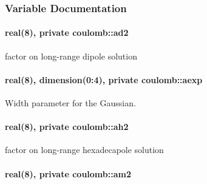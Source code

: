 \subsubsection{Variable Documentation}
\paragraph[{\texorpdfstring{ad2}{ad2}}]{\setlength{\rightskip}{0pt plus 5cm}real(8), private coulomb\+::ad2\hspace{0.3cm}{\ttfamily [private]}}\hypertarget{namespacecoulomb_afda3f373d6098c0a75ede859f3529343}{}\label{namespacecoulomb_afda3f373d6098c0a75ede859f3529343}


factor on long-\/range dipole solution 

\paragraph[{\texorpdfstring{aexp}{aexp}}]{\setlength{\rightskip}{0pt plus 5cm}real(8), dimension(0\+:4), private coulomb\+::aexp\hspace{0.3cm}{\ttfamily [private]}}\hypertarget{namespacecoulomb_a22c47ac5a6dd966aa0d24fa79c553716}{}\label{namespacecoulomb_a22c47ac5a6dd966aa0d24fa79c553716}


Width parameter for the Gaussian. 

\paragraph[{\texorpdfstring{ah2}{ah2}}]{\setlength{\rightskip}{0pt plus 5cm}real(8), private coulomb\+::ah2\hspace{0.3cm}{\ttfamily [private]}}\hypertarget{namespacecoulomb_a87a3eab5442a0668be2dfe42f7024081}{}\label{namespacecoulomb_a87a3eab5442a0668be2dfe42f7024081}


factor on long-\/range hexadecapole solution 

\paragraph[{\texorpdfstring{am2}{am2}}]{\setlength{\rightskip}{0pt plus 5cm}real(8), private coulomb\+::am2\hspace{0.3cm}{\ttfamily [private]}}\hypertarget{namespacecoulomb_ac7f2a0f0ede9bb820c275586d5f8cacb}{}\label{namespacecoulomb_ac7f2a0f0ede9bb820c275586d5f8cacb}


